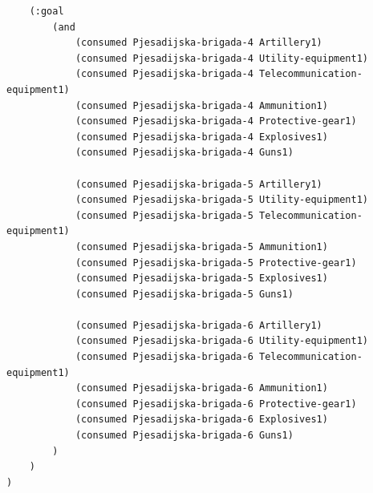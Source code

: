 \documentclass{article}
\begin{document}
\begin{verbatim}
    (:goal
        (and
            (consumed Pjesadijska-brigada-4 Artillery1)
            (consumed Pjesadijska-brigada-4 Utility-equipment1)
            (consumed Pjesadijska-brigada-4 Telecommunication-equipment1)
            (consumed Pjesadijska-brigada-4 Ammunition1)
            (consumed Pjesadijska-brigada-4 Protective-gear1)
            (consumed Pjesadijska-brigada-4 Explosives1)
            (consumed Pjesadijska-brigada-4 Guns1)
            
            (consumed Pjesadijska-brigada-5 Artillery1)
            (consumed Pjesadijska-brigada-5 Utility-equipment1)
            (consumed Pjesadijska-brigada-5 Telecommunication-equipment1)
            (consumed Pjesadijska-brigada-5 Ammunition1)
            (consumed Pjesadijska-brigada-5 Protective-gear1)
            (consumed Pjesadijska-brigada-5 Explosives1)
            (consumed Pjesadijska-brigada-5 Guns1)
            
            (consumed Pjesadijska-brigada-6 Artillery1)
            (consumed Pjesadijska-brigada-6 Utility-equipment1)
            (consumed Pjesadijska-brigada-6 Telecommunication-equipment1)
            (consumed Pjesadijska-brigada-6 Ammunition1)
            (consumed Pjesadijska-brigada-6 Protective-gear1)
            (consumed Pjesadijska-brigada-6 Explosives1)
            (consumed Pjesadijska-brigada-6 Guns1)
        )
    )
)

\end{verbatim}
\end{document}
